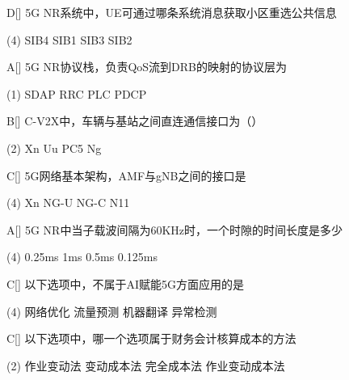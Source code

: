 \begin{choice}{D}[]
	5G NR系统中，UE可通过哪条系统消息获取小区重选公共信息
	\begin{tasks}(4)
		\task SIB4
		\task SIB1
		\task SIB3
		\task SIB2
	\end{tasks}
\end{choice}


\begin{choice}{A}[]
	5G NR协议栈，负责QoS流到DRB的映射的协议层为
	\begin{tasks}(1)
		\task SDAP
		\task RRC
		\task PLC
		\task PDCP
	\end{tasks}
\end{choice}



\begin{choice}{B}[]
	C-V2X中，车辆与基站之间直连通信接口为（）
	\begin{tasks}(2)
		\task Xn
		\task Uu
		\task PC5
		\task Ng
	\end{tasks}
\end{choice}



\begin{choice}{C}[]
	5G网络基本架构，AMF与gNB之间的接口是
	\begin{tasks}(4)
		\task Xn
		\task NG-U
		\task NG-C
		\task N11
	\end{tasks}
\end{choice}




\begin{choice}{A}[]
	5G NR中当子载波间隔为60KHz时，一个时隙的时间长度是多少
	\begin{tasks}(4)
		\task 0.25ms
		\task 1ms
		\task 0.5ms
		\task 0.125ms
	\end{tasks}
\end{choice}

\begin{choice}{C}[]
	以下选项中，不属于AI赋能5G方面应用的是
	\begin{tasks}(4)
		\task 网络优化
		\task 流量预测
		\task 机器翻译
		\task 异常检测
	\end{tasks}
\end{choice}

\begin{choice}{C}[]
	以下选项中，哪一个选项属于财务会计核算成本的方法
	\begin{tasks}(2)
		\task 作业变动法
		\task 变动成本法
		\task 完全成本法
		\task 作业变动成本法
	\end{tasks}
\end{choice}


